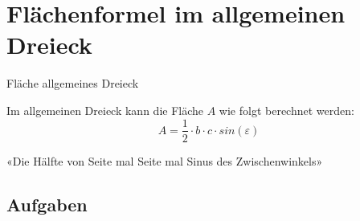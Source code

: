 
\newpage
\section{Flächenformel im allgemeinen
Dreieck}



\begin{gesetz}{Fläche allgemeines Dreieck}{}
  
Im allgemeinen Dreieck kann die Fläche $A$ wie folgt berechnet werden: 
$$A = \frac{1}{2}\cdot{}b\cdot{}c\cdot{}sin(\varepsilon)$$

«Die Hälfte von Seite mal Seite mal Sinus des Zwischenwinkels»

\end{gesetz}


\subsection*{Aufgaben}
\newpage

